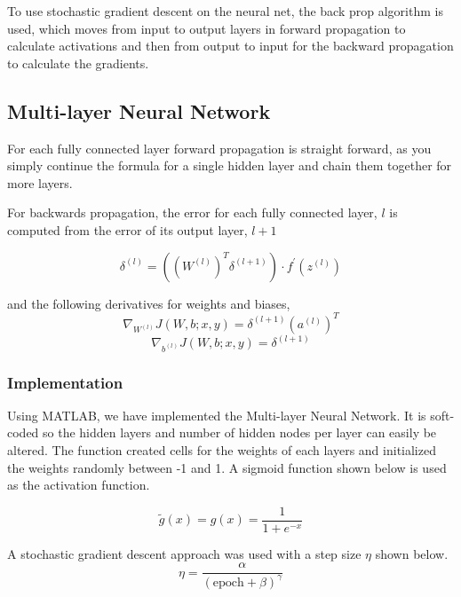\documentclass[12pt, twocolumn]{article}
\begin{document}
To use stochastic gradient descent  on the neural net, the back prop algorithm is used, which moves from input to output layers in forward propagation to calculate activations and then from output to input for the backward propagation to calculate the gradients. 


\subsection{Multi-layer Neural Network}


For each fully connected layer forward propagation is straight forward, as you simply continue the formula for a single hidden layer and chain them together for more layers. 

For backwards propagation, the error for each fully connected layer, $l$ is computed from the error of its output layer, $l+1$  

\begin{equation}
\delta^{(l)}=((W^{(l)})^T \delta^{(l+1)}) \cdot f ^{\prime} (z^{(l)})
\end{equation}

and the following derivatives for weights and biases, 
\begin{equation}
\nabla_{W^{(l)}}J(W,b;x,y) = \delta^{(l+1)}(a^{(l)})^T
\end{equation}
\begin{equation}
\nabla_{b^{(l)}}J(W,b;x,y)= \delta^{(l+1)}
\end{equation}

\subsubsection{Implementation}
Using MATLAB, we have implemented the Multi-layer Neural Network. It is soft-coded so the hidden layers and number of hidden nodes per layer can easily be altered. The function created cells for the weights of each layers and initialized the weights randomly between -1 and 1.
\newline
A sigmoid function shown below is used as the activation function.

\begin{equation}
\tilde{g}(x)= g(x) = \frac{1}{ 1+e^{-x}}
\end{equation}

A stochastic gradient descent approach was used with a step size $\eta$ shown below.
\begin{equation}
\eta = \frac{ \alpha}{ (\textrm{epoch} + \beta)^\gamma}
\end{equation}
\end{document}
